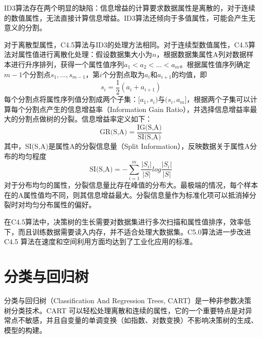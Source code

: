 ID3算法存在两个明显的缺陷：信息增益的计算要求数据属性是离散的，对于连续的数值属性，无法直接计算信息增益。ID3算法还倾向于多值属性，可能会产生无意义的分割。

对于离散型属性，C4.5算法与ID3的处理方法相同。对于连续型数值属性，C4.5算法对属性值进行离散化处理：假设数据集大小为$n$，根据数据集属性A列对数据样本进行升序排列，获得一个属性值序列$a_1<a_2<\ldots<a_m$。根据属性值序列确定$m-1$个分割点$s_1,\ldots, s_{m-1}$，第$i$个分割点取为$a_i$和$a_{i+1}$的均值，即
\[
    s_i = \frac{1}{2}(a_i + a_{i+1})
\]
每个分割点将属性序列值分割成两个子集：$[a_1,s_i)$与$(s_i,a_m]$，根据两个子集可以计算每个分割点产生的信息增益率（Information Gain Ratio），并选择信息增益率最大的分割点做树的分裂。信息增益率定义如下：
\begin{equation}
    \text{GR(S,A)} = \frac{\text{IG(S,A)}}{\text{SI(S,A)}}
\end{equation}
其中，SI(S,A)是属性A的分裂信息量（Split Information），反映数据关于属性A分布的均匀程度
\begin{equation}
    \text{SI(S,A)} = -\sum\limits_{i=1}^m \frac{|S_i|}{|S|} log \frac{|S_i|}{|S|}
\end{equation}
对于分布均匀的属性，分裂信息量比存在峰值的分布大。最极端的情况，每个样本在的A属性值均不同，则其信息增益最大。分裂信息量作为标准化项可以抵消掉分裂时对均匀分布属性的偏好。

在C4.5算法中，决策树的生长需要对数据集进行多次扫描和属性值排序，效率低下，而且训练数据需要读入内存，并不适合处理大数据集。C5.0算法进一步改进C4.5 算法在速度和空间利用方面均达到了工业化应用的标准。

\section{分类与回归树}
分类与回归树（Classification And Regression Trees, CART）是一种非参数决策树分类技术\cite{breiman1993classification}。CART 可以轻松处理离散和连续的属性，它的一个重要特点是对异常点不敏感，并且自变量的单调变换（如指数、对数变换）不影响决策树的生成、模型的构建。

